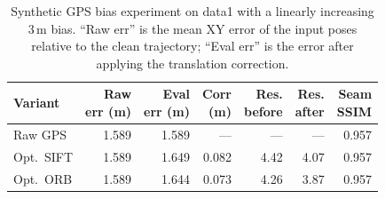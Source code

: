 \begin{table}[t]
\centering
\caption{Synthetic GPS bias experiment on data1 with a linearly
         increasing 3\,m bias.  ``Raw err'' is the mean XY error of the
         input poses relative to the clean trajectory; ``Eval err'' is
         the error after applying the translation correction.}
\label{tab:bias_test}
\begin{tabular}{l rrrrrr}
\toprule
Variant
  & \parbox{0.9cm}{\centering Raw\\err (m)}
  & \parbox{0.9cm}{\centering Eval\\err (m)}
  & \parbox{0.8cm}{\centering Corr\\(m)}
  & \parbox{1.0cm}{\centering Res.\\before}
  & \parbox{1.0cm}{\centering Res.\\after}
  & \parbox{0.9cm}{\centering Seam\\SSIM} \\
\midrule
Raw GPS      & 1.589 & 1.589 & ---   & ---  & ---  & 0.957 \\
Opt.\ SIFT   & 1.589 & 1.649 & 0.082 & 4.42 & 4.07 & 0.957 \\
Opt.\ ORB    & 1.589 & 1.644 & 0.073 & 4.26 & 3.87 & 0.957 \\
\bottomrule
\end{tabular}
\end{table}

